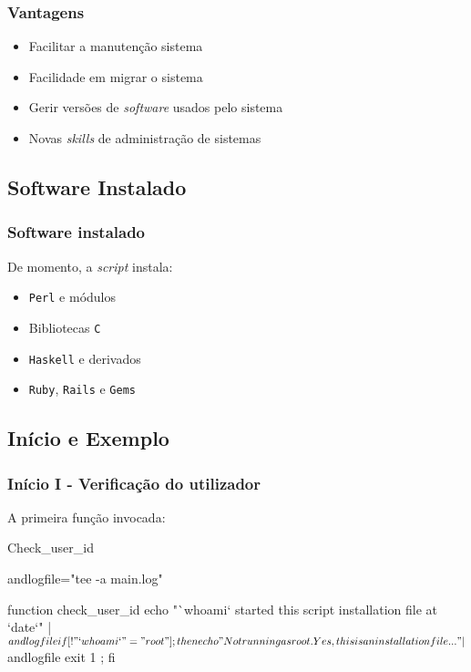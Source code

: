 \documentclass{beamer}
\begin{document}
\begin{frame}[fragile] \frametitle{Vantagens}
\begin{itemize}
 \item Facilitar a manutenção sistema
 \item Facilidade em migrar o sistema
 \item Gerir versões de \emph{software} usados pelo sistema
 \item Novas \emph{skills} de administração de sistemas
\end{itemize}
\end{frame}

\subsection{Software Instalado}
\begin{frame}[fragile] \frametitle{Software instalado}
De momento, a \emph{script} instala:

\begin{itemize}
 \item \texttt{Perl} e módulos
 \item Bibliotecas \texttt{C} 
 \item \texttt{Haskell} e derivados
 \item \texttt{Ruby}, \texttt{Rails} e \texttt{Gems}
\end{itemize}
\end{frame}

\subsection{Início e Exemplo}
\begin{frame}[fragile] \frametitle{Início I - Verificação do utilizador}
A primeira função invocada:
\begin{block}{Check\_user\_id}
\begin{haskell}
andlogfile="tee -a main.log"

function check_user_id {
        echo "`whoami` started this script installation file at `date`" | $andlogfile
        if [ ! "`whoami`" = "root" ]; then
                echo "Not running as root. Yes, this is an installation file..." | $andlogfile
                exit 1 ;
        fi
}
\end{haskell}
\end{block}
\end{frame}
\end{document}
